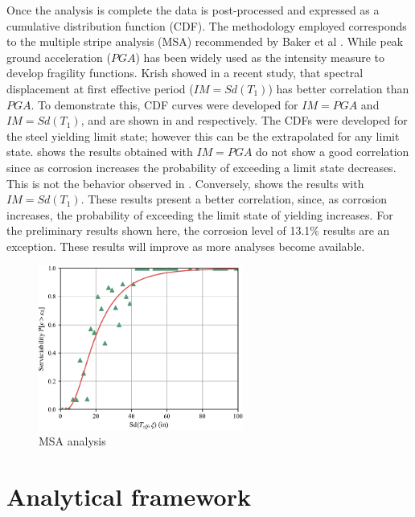 Once the analysis is complete the data is post-processed and expressed as a cumulative distribution function (CDF). The methodology employed corresponds to the multiple stripe analysis (MSA) recommended by Baker et al \cite{Baker2015}. While peak ground acceleration ($PGA$) has been widely used as the intensity measure to develop fragility functions\cite{Ghosh2015}\cite{Bisadi2015}\cite{Shekhar2018}. Krish \cite{Krish2018} showed in a recent study, that spectral displacement at first effective period ($IM=Sd(T_1)$) has better correlation than $PGA$. To demonstrate this, CDF curves were developed for $IM=PGA$ and $IM=Sd(T_1)$, and are shown in  and  respectively. The CDFs were developed for the steel yielding limit state; however this can be the extrapolated for any limit state.  shows the results obtained with $IM=PGA$ do not show a good correlation since as corrosion increases the probability of exceeding a limit state decreases. This is not the behavior observed in . Conversely,  shows the results with $IM=Sd(T_1)$. These results present a better correlation, since, as corrosion increases, the probability of exceeding the limit state of yielding increases. For the preliminary results shown here, the corrosion level of 13.1\% results are an exception. These results will improve as more analyses become available. 

\begin{figure}[htp]
	\centering
	\includegraphics[width=0.60\textwidth]{VAC Thesis 2.0/Chapter-5/figs/MSA_Calc.pdf}
	\caption{MSA analysis}
	\label{fig:msa_sample_01}
\end{figure}

\section{Analytical framework}

